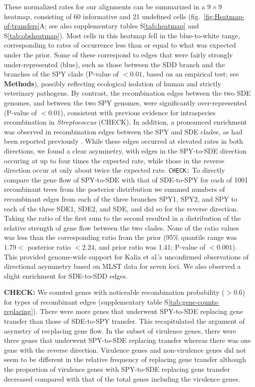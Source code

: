 \documentclass[12pt]{article}
\begin{document}
These normalized rates for our alignments can be summarized in a $9 \times
9$ heatmap, consisting of 60 informative and 21 undefined cells (fig.\
\ref{fig:Heatmap-of-transfers}A; see also supplementary tables
S\ref{tab:heatmap} and S\ref{tab:obsheatmap}).  Most cells in this heatmap
fell in the blue-to-white range, corresponding to rates of occurrence less
than or equal to what was expected under the prior.  Some of these
correspond to edges that were fairly strongly under-represented (blue),
such as those between the SDD branch and the branches of the SPY clade
(P-value of $<0.01$, based on an empirical test; see \textbf{Methods}),
possibly reflecting ecological isolation of human and strictly veterinary
pathogens.  By contrast, the recombination edges between the two SDE
genomes, and between the two SPY genomes, were significantly
over-represented (P-value of $<0.01$), consistent with previous evidence
for intraspecies recombination in {\em Streptococcus} \citep{Feil2001}
(CHECK).  In addition, a pronounced enrichment was observed in
recombination edges between the SPY and SDE clades, as had been reported
previously \citep{Kalia2001,Sachse2002,Kalia2004,Davies2005,Davies2007a}.
While these edges occurred at elevated rates in both directions, we found a
clear asymmetry, with edges in the SPY-to-SDE direction occuring at up to
four times the expected rate, while those in the reverse direction occur at
only about twice the expected rate.  \texttt{CHECK:} To directly compare
the gene flow of SPY-to-SDE with that of SDE-to-SPY for each of 1001
recombinant trees from the posterior distribution we summed numbers of
recombinant edges from each of the three branches SPY1, SPY2, and SPY to
each of the three SDE1, SDE2, and SDE, and did so for the reverse
direction.  Taking the ratio of the first sum to the second resulted in a
distribution of the relative strength of gene flow between the two clades.
None of the ratio values was less than the corresponding ratio from the
prior (95\% quantile range was $1.79 <$ posterior ratio $< 2.24$, and prior
ratio was 1.41; P-value of $< 0.001$).  This provided genome-wide support
for Kalia et al.'s \citeyearpar{Kalia2001} unconfirmed observations of
directional asymmetry based on MLST data for seven loci.  We also observed
a slight enrichment for SDE-to-SDD edges.

\textbf{CHECK:} We counted genes with noticeable recombination probability 
($>0.6$) for types of recombinant edges
(supplementary table S\ref{tab:gene-counts-replacing}). There were more genes
that underwent SPY-to-SDE replacing gene transfer than those of SDE-to-SPY
transfer. This recapitulated the argument of asymetry of recplacing gene flow.
In the subset of virulence genes, there were three genes that underwent
SPY-to-SDE replacing transfer whereas there was one gene with the reverse
direction. 
Virulence genes and non-virulence genes did not seem to be different in the
relative frequency of replacing gene transfer
although the proportion of virulence genes with SPY-to-SDE replacing gene
transfer decreased compared with that of the total genes including the
virulence genes. 
\end{document}
